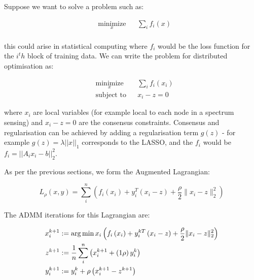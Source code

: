 \documentclass{article}
\begin{document}
\begin{example}[Consensus]

Suppose we want to solve a problem such as:

\begin{equation*}
\begin{aligned}
& \underset{x}{\text{minimize}}
& & \sum_i f_i\left( x \right) \\
\label{consensus}
\end{aligned}
\end{equation*}

this could arise in statistical computing where \(f_i\) would be the loss function for the \(i^th\) block of training data. We can write the problem for distributed optimisation as:

\begin{equation*}
\begin{aligned}
& \underset{x}{\text{minimize}}
& & \sum_i f_i\left( x_i \right) \\
& \text{subject to}
& & x_i - z = 0
\label{admm_consensus}
\end{aligned}
\end{equation*}

where \(x_i\) are local variables (for example local to each node in a spectrum sensing) and \(x_i - z = 0\) are the consensus constraints. Consensus and regularisation can be achieved by adding a regularisation term \(g\left(z\right)\) - for example \(g\left(z\right) = \lambda||x||_1\) corresponds to the LASSO, and the \(f_i\) would be \(f_i = ||A_ix_i - b||_2^2\). 

As per the previous sections, we form the Augmented Lagrangian:

\begin{equation}
L_\rho\left(x,y\right) = \sum_i^n \left(f_i\left( x_i \right) + y_i^T\left(x_i-z\right) + \frac{\rho}{2}\|x_i-z\|_2^2\right)
\end{equation}

The ADMM iterations for this Lagrangian are:

\begin{align}
x_i^{k+1} &:= \operatorname*{arg\,min}{x_i} \left(f_i\left( x_i \right) + y_i^{kT}\left(x_i-z\right) + \frac{\rho}{2}\|x_i-z\|_2^2\right)\\
z^{k+1} &:= \frac{1}{n}\sum_i^n \left(x_i^{k+1} + \left(1\rho\right)y_i^k\right)\\
y_i^{k+1} &:= y_i^{k} + \rho \left(x_i^{k+1} - z^{k+1} \right)
\label{consensus_iterations}
\end{align}


\end{example}
\end{document}
